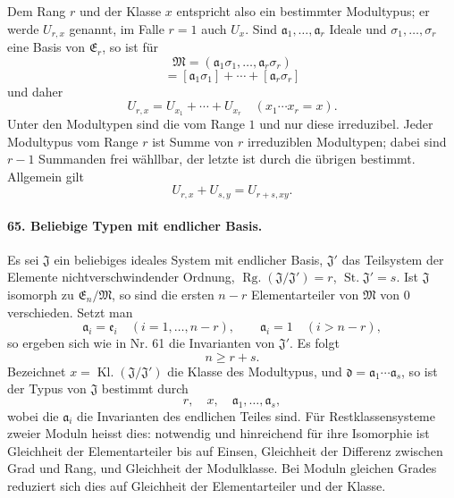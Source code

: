 \documentclass[11pt]{article}
\newcommand{\Rg}{\operatorname{Rg.}}
\newcommand{\Kl}{\operatorname{Kl.}}
\newcommand{\St}{\operatorname{St.}}
\begin{document}
Dem Rang $r$ und der Klasse $x$ entspricht also ein bestimmter Modultypus; er werde $U_{r,x}$ genannt, im Falle $r=1$ auch $U_x$. Sind $\mathfrak a_1,
\ldots,
\mathfrak a_r$ Ideale und $\sigma_1,
\ldots,
\sigma_r$ eine Basis von $\mathfrak E_r$, so ist für
\[
  \mathfrak M=(\mathfrak a_1\sigma_1,
\ldots,
\mathfrak a_r\sigma_r)
\]
\begin{equation}
  [\mathfrak M]=[\mathfrak a_1\sigma_1]+\cdots+[\mathfrak a_r\sigma_r]
\tag{120}
\end{equation}
und daher
\begin{equation}
  U_{r,x}=U_{x_1}+\cdots+U_{x_r}
  \quad (x_1\cdots x_r=x).
\tag{121}
\end{equation}
Unter den Modultypen sind die vom Range $1$ und nur diese irreduzibel. Jeder Modultypus vom Range $r$ ist Summe von $r$ irreduziblen Modultypen; dabei sind $r-1$ Summanden frei wähllbar, der letzte ist durch die übrigen bestimmt. Allgemein gilt
\[
  U_{r,x}+U_{s,y}=U_{r+s,xy}.
\]

\paragraph{65. Beliebige Typen mit endlicher Basis.}
Es sei $\mathfrak J$ ein beliebiges ideales System mit endlicher Basis, $\mathfrak J'$ das Teilsystem der Elemente nichtverschwindender Ordnung, $\Rg(\mathfrak J/\mathfrak J')=r$, $\St\mathfrak J'=s$. Ist $\mathfrak J$ isomorph zu $\mathfrak E_n/\mathfrak M$, so sind die ersten $n-r$ Elementarteiler von $\mathfrak M$ von $0$ verschieden. Setzt man
\[
  \mathfrak a_i=\mathfrak e_i\quad (i=1,\ldots,n-r),
  \qquad
  \mathfrak a_i=1\quad (i>n-r),
\]
so ergeben sich wie in Nr. 61 die Invarianten von $\mathfrak J'$. Es folgt
\begin{equation}
  n\ge r+s.
\tag{122}
\end{equation}
Bezeichnet $x=\Kl(\mathfrak J/\mathfrak J')$ die Klasse des Modultypus, und $\mathfrak d=\mathfrak a_1\cdots\mathfrak a_s$, so ist der Typus von $\mathfrak J$ bestimmt durch
\begin{equation}
  r,
  \quad x,
  \quad \mathfrak a_1,\ldots,
\mathfrak a_s,
\tag{123}
\end{equation}
wobei die $\mathfrak a_i$ die Invarianten des endlichen Teiles sind. Für Restklassensysteme zweier Moduln heisst dies: notwendig und hinreichend für ihre Isomorphie ist Gleichheit der Elementarteiler bis auf Einsen, Gleichheit der Differenz zwischen Grad und Rang, und Gleichheit der Modulklasse. Bei Moduln gleichen Grades reduziert sich dies auf Gleichheit der Elementarteiler und der Klasse.
\end{document}
